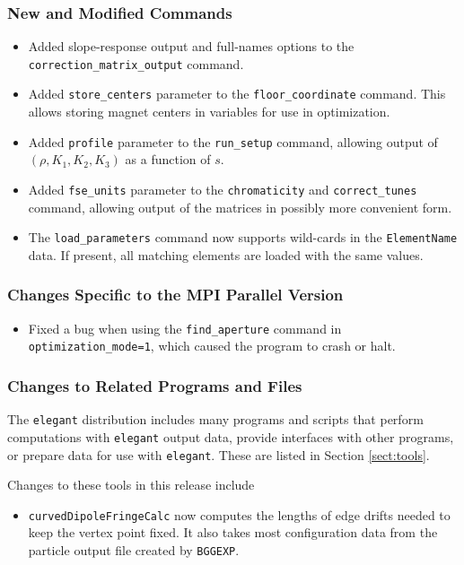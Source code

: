 \documentclass[11pt]{article}
\begin{document}
\subsubsection{New and Modified Commands}
\begin{itemize}
\item Added slope-response output and full-names options to the \verb|correction_matrix_output| command.
\item Added \verb|store_centers| parameter to the \verb|floor_coordinate| command. This allows storing magnet centers in
  variables for use in optimization.
\item Added \verb|profile| parameter to the \verb|run_setup| command, allowing output of $(\rho, K_1, K_2, K_3)$
  as a function of $s$.
\item Added \verb|fse_units| parameter to the \verb|chromaticity| and \verb|correct_tunes| command, allowing output of
  the matrices in possibly more convenient form.
\item The \verb|load_parameters| command now supports wild-cards in the \verb|ElementName| data. If present, all
  matching elements are loaded with the same values.
\end{itemize}

\subsubsection{Changes Specific to the MPI Parallel Version}

\begin{itemize}
\item Fixed a bug when using the \verb|find_aperture| command in \verb|optimization_mode=1|, which caused
  the program to crash or halt.
\end{itemize}

\subsubsection{Changes to Related Programs and Files}

The {\tt elegant} distribution includes many programs and scripts that perform computations with {\tt elegant}
output data, provide interfaces with other programs, or prepare data for use with {\tt elegant}. These
are listed in Section \ref{sect:tools}. 

Changes to these tools in this release include
\begin{itemize}
\item \verb|curvedDipoleFringeCalc| now computes the lengths of edge drifts needed to
  keep the vertex point fixed. It also takes most configuration data from the particle output file 
  created by \verb|BGGEXP|.
\end{itemize}
\end{document}
